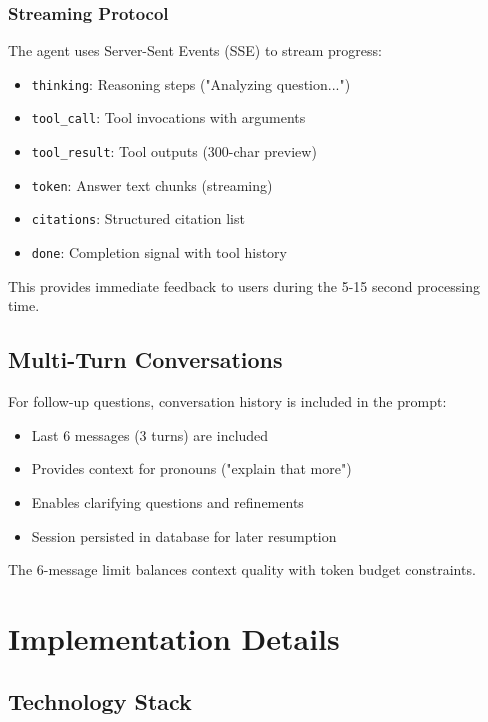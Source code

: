 \documentclass[12pt,a4paper]{article}
\begin{document}
\subsubsection{Streaming Protocol}

The agent uses Server-Sent Events (SSE) to stream progress:

\begin{itemize}
    \item \texttt{thinking}: Reasoning steps ("Analyzing question...")
    \item \texttt{tool\_call}: Tool invocations with arguments
    \item \texttt{tool\_result}: Tool outputs (300-char preview)
    \item \texttt{token}: Answer text chunks (streaming)
    \item \texttt{citations}: Structured citation list
    \item \texttt{done}: Completion signal with tool history
\end{itemize}

This provides immediate feedback to users during the 5-15 second processing time.

\subsection{Multi-Turn Conversations}

For follow-up questions, conversation history is included in the prompt:

\begin{itemize}
    \item Last 6 messages (3 turns) are included
    \item Provides context for pronouns ("explain that more")
    \item Enables clarifying questions and refinements
    \item Session persisted in database for later resumption
\end{itemize}

The 6-message limit balances context quality with token budget constraints.

\newpage

\section{Implementation Details}
\label{sec:implementation}

\subsection{Technology Stack}
\end{document}
